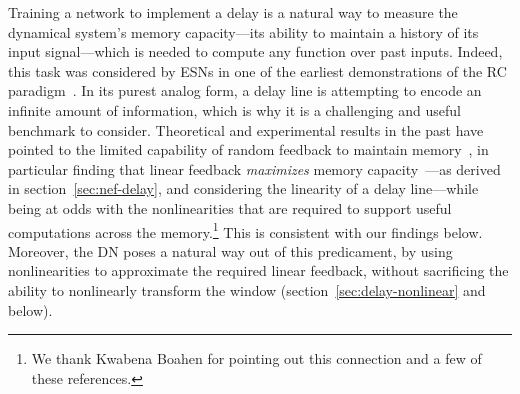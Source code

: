 Training a network to implement a delay is a natural way to measure the dynamical system's memory capacity---its ability to maintain a history of its input signal---which is needed to compute any function over past inputs.
Indeed, this task was considered by ESNs in one of the earliest demonstrations of the RC paradigm~\citep{jaeger2002short}.  In its purest analog form, a delay line is attempting to encode an infinite amount of information, which is why it is a challenging and useful benchmark to consider.
Theoretical and experimental results in the past have pointed to the limited capability of random feedback to maintain memory~\citep{joshi2005movement, mayor2005signal, dambre2012information, wallace2013randomly, inubushi2017reservoir, schuecker2018optimal}, in particular finding that linear feedback \emph{maximizes} memory capacity~\citep{mitra2001nonlinear}---as derived in section~\ref{sec:nef-delay}, and considering the linearity of a delay line---while being at odds with the nonlinearities that are required to support useful computations across the memory.\footnote{%
We thank Kwabena Boahen for pointing out this connection and a few of these references.
}
This is consistent with our findings below.
Moreover, the DN poses a natural way out of this predicament, by using nonlinearities to approximate the required linear feedback, without sacrificing the ability to nonlinearly transform the window (section~\ref{sec:delay-nonlinear} and below).

